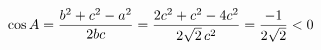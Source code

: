 \documentclass[preview]{standalone}
\begin{document}
\begin{align*}
\special{dvisvgm:raw <g id='unique000'>}\cos A=\frac{b^2+c^2-a^2}{2bc}=\frac{2c^2+c^2-4c^2}{2\sqrt{2}\,c^2}=\frac{-1}{2\sqrt{2}}<0\special{dvisvgm:raw </g>}
\end{align*}
\end{document}
